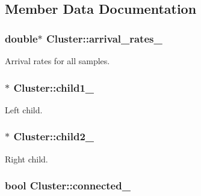 \subsection{Member Data Documentation}
\hypertarget{classCluster_a36ca822c0abc99d2f1b961a2bb761891}{
\subsubsection[{arrival\_\-rates\_\-}]{\setlength{\rightskip}{0pt plus 5cm}double$\ast$ {\bf Cluster::arrival\_\-rates\_\-}}}
\label{classCluster_a36ca822c0abc99d2f1b961a2bb761891}
Arrival rates for all samples. \hypertarget{classCluster_a6ffa9739a418a6c0de5898a05fad3c1f}{
\subsubsection[{child1\_\-}]{$\ast$ {\bf Cluster::child1\_\-}}}
\label{classCluster_a6ffa9739a418a6c0de5898a05fad3c1f}
Left child. \hypertarget{classCluster_a715210b5163bc07d4835556332812059}{
\subsubsection[{child2\_\-}]{$\ast$ {\bf Cluster::child2\_\-}}}
\label{classCluster_a715210b5163bc07d4835556332812059}
Right child. \hypertarget{classCluster_ab3bf6a835394cd4d00d5381fb49f7180}{
\subsubsection[{connected\_\-}]{\setlength{\rightskip}{0pt plus 5cm}bool {\bf Cluster::connected\_\-}}}
\label{classCluster_ab3bf6a835394cd4d00d5381fb49f7180}
